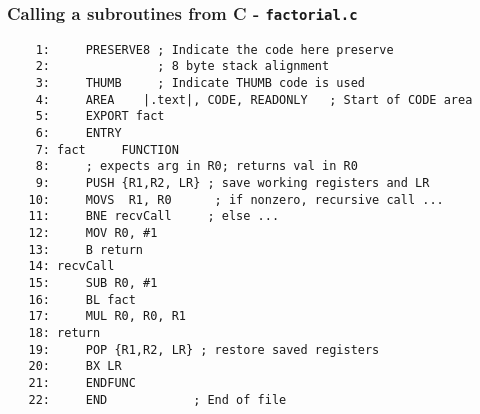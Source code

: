 \documentclass[10pt]{beamer}
\begin{document}
\begin{frame} [fragile]
\frametitle{Calling a subroutines from C - \texttt{factorial.c}}
{\small \color{brown}
\begin{verbatim}
    1:     PRESERVE8 ; Indicate the code here preserve 
    2:               ; 8 byte stack alignment
    3:     THUMB     ; Indicate THUMB code is used
    4:     AREA    |.text|, CODE, READONLY   ; Start of CODE area
    5:     EXPORT fact
    6:     ENTRY
    7: fact     FUNCTION
    8:     ; expects arg in R0; returns val in R0
    9:     PUSH {R1,R2, LR} ; save working registers and LR
   10:     MOVS  R1, R0  	 ; if nonzero, recursive call ... 
   11:     BNE recvCall     ; else ...
   12:     MOV R0, #1
   13:     B return
   14: recvCall
   15:     SUB R0, #1
   16:     BL fact
   17:     MUL R0, R0, R1
   18: return
   19:     POP {R1,R2, LR} ; restore saved registers
   20:     BX LR
   21:     ENDFUNC
   22:     END            ; End of file
\end{verbatim}
}
\end{frame}
\end{document}
